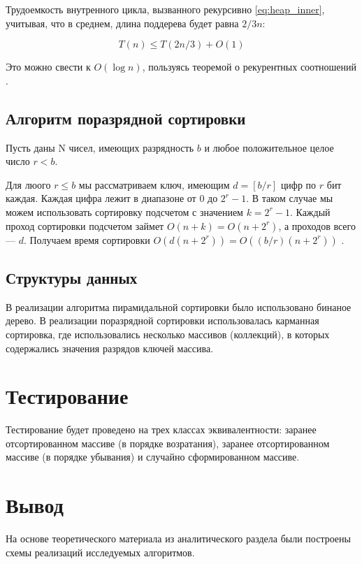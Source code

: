 Трудоемкость внутренного цикла, вызванного рекурсивно \ref{eq:heap_inner}, учитывая, что в среднем, длина поддерева будет равна $2/3n$:
    
\begin{equation}
    T(n) \leq T(2n/3) + O(1)
    \label{eq:heap_inner}
\end{equation}

Это можно свести к $O(\log n)$, пользуясь теоремой о рекурентных соотношений \cite{intro_to_algo_heap}.

\subsection{Алгоритм поразрядной сортировки}
Пусть даны N чисел, имеющих разрядность $b$ и любое положительное целое число $r < b$.

Для люого $r \leq b$ мы рассматриваем ключ, имеющим $d = [ b / r ]$ цифр по $r$ бит каждая. Каждая цифра лежит в диапазоне от $0$ до $2^{r} - 1$. В таком случае мы можем использовать сортировку подсчетом с значением $k = 2^r - 1$. Каждый проход сортировки подсчетом займет $O(n + k) = O(n + 2^r)$, а проходов всего --- $d$. Получаем время сортировки $O(d(n + 2^r)) = O((b/r)(n + 2^r))$ \cite{intro_to_algo_radix}.

\subsection{Структуры данных}

В реализации алгоритма пирамидальной сортировки было использовано бинаное дерево. В реализации поразрядной сортировки использовалась карманная сортировка, где использовались несколько массивов (коллекций), в которых содержались значения разрядов ключей массива.

\section{Тестирование}
Тестирование будет проведено на трех классах эквивалентности: заранее отсортированном массиве (в порядке возратания), заранее отсортированном массиве (в порядке убывания) и случайно сформированном массиве.


\section{Вывод}

На основе теоретического материала из аналитического раздела были построены схемы реализаций исследуемых алгоритмов.


